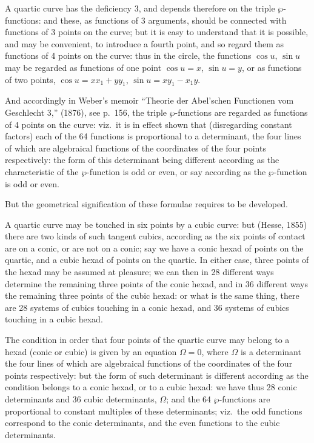 \documentclass[11pt,a4paper]{book}
\begin{document}
A quartic curve has the deficiency 3, and depends therefore on the triple $\wp$-functions: and these, as functions of 3 arguments, should be connected with functions of 3 points on the curve; but it is easy to understand that it is possible, and may be convenient, to introduce a fourth point, and so regard them as functions of 4 points on the curve: thus in the circle, the functions $\cos u$, $\sin u$ may be regarded as functions of one point $\cos u = x$, $\sin u = y$, or as functions of two points, $\cos u = xx_1 + yy_1$, $\sin u = xy_1 - x_1y$.

And accordingly in Weber's memoir ``Theorie der Abel'schen Functionen vom Geschlecht 3,'' (1876), see p.\ 156, the triple $\wp$-functions are regarded as functions of 4 points on the curve: viz.\ it is in effect shown that (disregarding constant factors) each of the 64 functions is proportional to a determinant, the four lines of which are algebraical functions of the coordinates of the four points respectively: the form of this determinant being different according as the characteristic of the $\wp$-function is odd or even, or say according as the $\wp$-function is odd or even.

But the geometrical signification of these formulae requires to be developed.

\clearpage
A quartic curve may be touched in six points by a cubic curve: but (Hesse, 1855) there are two kinds of such tangent cubics, according as the six points of contact are on a conic, or are not on a conic; say we have a conic hexad of points on the quartic, and a cubic hexad of points on the quartic. In either case, three points of the hexad may be assumed at pleasure; we can then in 28 different ways determine the remaining three points of the conic hexad, and in 36 different ways the remaining three points of the cubic hexad: or what is the same thing, there are 28 systems of cubics touching in a conic hexad, and 36 systems of cubics touching in a cubic hexad.

The condition in order that four points of the quartic curve may belong to a hexad (conic or cubic) is given by an equation $\Omega = 0$, where $\Omega$ is a determinant the four lines of which are algebraical functions of the coordinates of the four points respectively: but the form of such determinant is different according as the condition belongs to a conic hexad, or to a cubic hexad: we have thus 28 conic determinants and 36 cubic determinants, $\Omega$; and the 64 $\wp$-functions are proportional to constant multiples of these determinants; viz.\ the odd functions correspond to the conic determinants, and the even functions to the cubic determinants.
\end{document}

